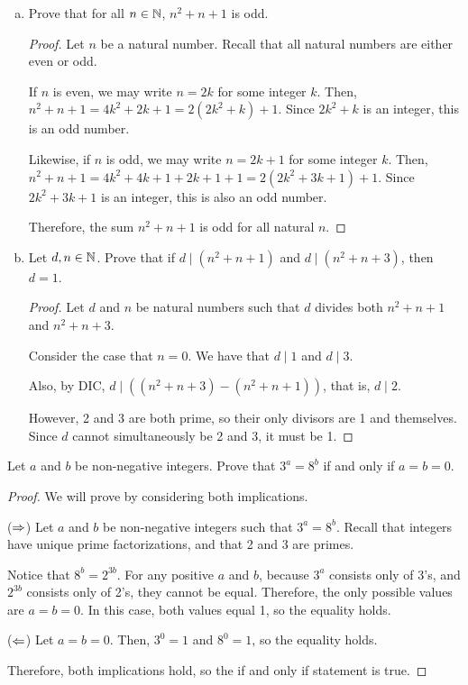 \question \begin{enumerate}[(a)]
  \item Prove that for all $n\in\mathbb{N}$, $n^2+n+1$ is odd.
        \begin{proof}
          Let $n$ be a natural number.
          Recall that all natural numbers are either even or odd.

          If $n$ is even, we may write $n=2k$ for some integer $k$.
          Then, $n^2+n+1 = 4k^2 + 2k + 1 = 2(2k^2+k) + 1$.
          Since $2k^2+k$ is an integer, this is an odd number.

          Likewise, if $n$ is odd, we may write $n=2k+1$ for some integer $k$.
          Then, $n^2+n+1 = 4k^2+4k+1 + 2k+1 + 1 = 2(2k^2+3k+1)+1$.
          Since $2k^2+3k+1$ is an integer, this is also an odd number.

          Therefore, the sum $n^2+n+1$ is odd for all natural $n$.
        \end{proof}
  \item Let $d,n\in\mathbb{N}$.
        Prove that if $d \mid (n^2+n+1)$ and $d \mid (n^2+n+3)$, then $d=1$.
        \begin{proof}
          Let $d$ and $n$ be natural numbers such that $d$ divides both $n^2+n+1$ and $n^2+n+3$.

          Consider the case that $n = 0$.
          We have that $d \mid 1$ and $d \mid 3$.

          Also, by DIC, $d \mid \left((n^2+n+3) - (n^2+n+1)\right)$, that is, $d \mid 2$.

          However, 2 and 3 are both prime, so their only divisors are 1 and themselves.
          Since $d$ cannot simultaneously be 2 and 3, it must be 1.
        \end{proof}
\end{enumerate}


\question Let $a$ and $b$ be non-negative integers.
Prove that $3^a=8^b$ if and only if $a=b=0$.
\begin{proof}
  We will prove by considering both implications.

  ($\Rightarrow$) Let $a$ and $b$ be non-negative integers such that $3^a=8^b$.
  Recall that integers have unique prime factorizations, and that 2 and 3 are primes.

  Notice that $8^b=2^{3b}$.
  For any positive $a$ and $b$, because $3^a$ consists only of 3's, and $2^{3b}$ consists only of 2's, they cannot be equal.
  Therefore, the only possible values are $a=b=0$.
  In this case, both values equal 1, so the equality holds.

  ($\Leftarrow$) Let $a=b=0$. Then, $3^0=1$ and $8^0=1$, so the equality holds.

  Therefore, both implications hold, so the if and only if statement is true.
\end{proof}

